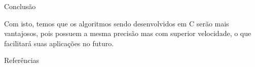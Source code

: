 \documentclass{beamer}
\begin{document}
\begin{frame}{Conclusão}
    
Com isto, temos que os algoritmos sendo desenvolvidos em C serão mais vantajosos, pois possuem a mesma precisão mas com superior velocidade, o que facilitará suas aplicações no futuro.

\end{frame}

\begin{frame}{Referências}
    
    \tiny
\end{frame}
\end{document}
